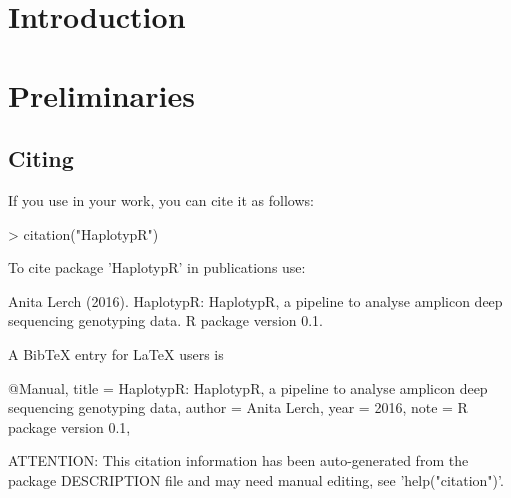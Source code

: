 \documentclass[12pt]{article}
\author{Anita Lerch}
\date{Modified: December 19 2014. Compiled: \today}
\begin{document}

%
%



\maketitle

\tableofcontents

\newpage


\section{Introduction}



\section{Preliminaries}

\subsection{Citing }
If you use  \cite{HaplotypR} in your work, you can cite it as follows:
\begin{Schunk}
\begin{Sinput}
> citation("HaplotypR")
\end{Sinput}
\begin{Soutput}
To cite package 'HaplotypR' in publications use:

  Anita Lerch (2016). HaplotypR: HaplotypR, a pipeline to analyse
  amplicon deep sequencing genotyping data. R package version 0.1.

A BibTeX entry for LaTeX users is

  @Manual{,
    title = {HaplotypR: HaplotypR, a pipeline to analyse amplicon deep sequencing genotyping data},
    author = {Anita Lerch},
    year = {2016},
    note = {R package version 0.1},
  }

ATTENTION: This citation information has been auto-generated from the
package DESCRIPTION file and may need manual editing, see
'help("citation")'.
\end{Soutput}
\end{Schunk}
\end{document}
